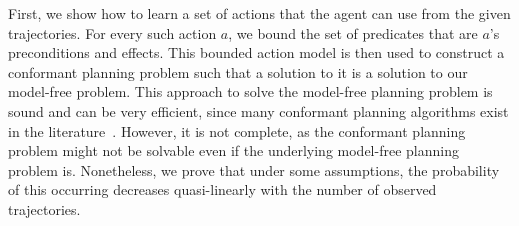 \documentclass{article}
\newcommand{\MEMO}[1]
{ \fbox{
		\begin{minipage}[b]{7.9 cm}
			#1
		\end{minipage}
} }
\begin{document}
	
	First, we show how to learn a set of actions that the agent can use from the given trajectories. 
	For every such action $a$, we bound the set of predicates that are $a$'s preconditions and effects. This bounded action model is then used  to construct a conformant planning problem such that a solution to it is a solution to our model-free problem. This approach to solve the model-free planning problem 
	is sound and can be very efficient, since many conformant planning algorithms exist in the literature~\cite{palacios2009compiling,hoffmann2006conformant}. 
	However, it is not complete, as the conformant planning problem might not be solvable even if the underlying model-free planning problem is. Nonetheless, we prove that under some assumptions, the probability of this occurring decreases quasi-linearly with the number of observed trajectories. %
	
	
	
	
	
	
\end{document}
